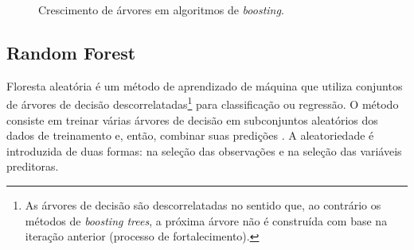 \begin{apendicesenv}
\begin{figure}

\begin{minipage}{\linewidth}



\end{minipage}%
\newline
\begin{minipage}{\linewidth}



\end{minipage}%

\caption{\label{fig-tree-growth}Crescimento de árvores em algoritmos de
\emph{boosting}.}

\end{figure}%

\subsection{Random Forest}\label{random-forest}

Floresta aleatória é um método de aprendizado de máquina que utiliza
conjuntos de árvores de decisão descorrelatadas\footnote{As árvores de
  decisão são descorrelatadas no sentido que, ao contrário os métodos de
  \emph{boosting trees}, a próxima árvore não é construída com base na
  iteração anterior (processo de fortalecimento).} para classificação ou
regressão. O método consiste em treinar várias árvores de decisão em
subconjuntos aleatórios dos dados de treinamento e, então, combinar suas
predições \autocite{hastie_elements_2009}. A aleatoriedade é introduzida
de duas formas: na seleção das observações e na seleção das variáveis
preditoras.


\end{apendicesenv}
